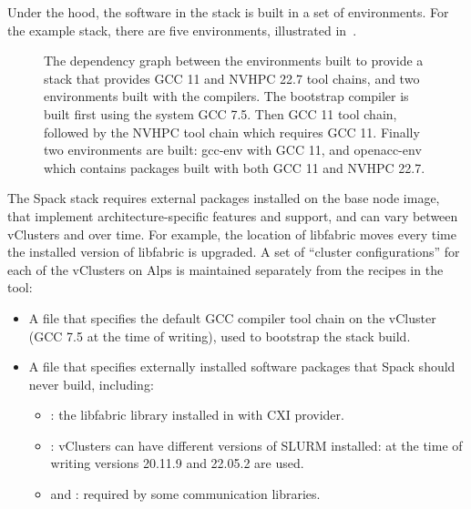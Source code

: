 Under the hood, the software in the stack is built in a set of \spack environments.
For the example stack, there are five environments, illustrated in~.

\begin{figure}[htp!]
    \begin{center}
    
    \end{center}
    \caption{The dependency graph between the \spack environments built to provide a \spack stack that provides GCC 11 and NVHPC 22.7 tool chains, and two environments built with the compilers. The bootstrap compiler is built first using the system GCC 7.5. Then GCC 11 tool chain, followed by the NVHPC tool chain which requires GCC 11. Finally two environments are built: gcc-env with GCC 11, and openacc-env which contains packages built with both GCC 11 and NVHPC 22.7.}
    \label{fig:env-dag}
\end{figure}

The Spack stack requires external packages installed on the base node image, that implement architecture-specific features and support, and can vary between vClusters and over time.
For example, the location of libfabric moves every time the installed version of libfabric is upgraded.
A set of ``cluster configurations'' for each of the vClusters on Alps is maintained separately from the recipes in the \stackinator tool:
\begin{itemize}
    \item A \spack {} file that specifies the default GCC compiler tool chain on the vCluster (GCC 7.5 at the time of writing), used to bootstrap the \spack stack build.
    \item A \spack {} file that specifies externally installed software packages that Spack should never build, including:
    \begin{itemize}
        \item {}: the libfabric library installed in  with CXI provider.
        \item {}: vClusters can have different versions of SLURM installed: at the time of writing versions 20.11.9 and 22.05.2 are used.
        \item {} and : required by some communication libraries.
    \end{itemize}
\end{itemize}

